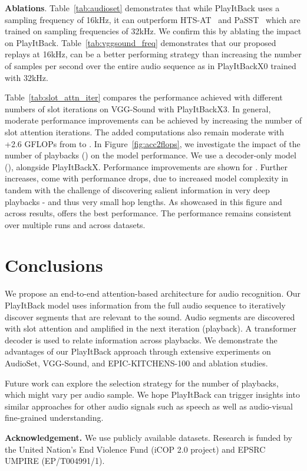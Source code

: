 \documentclass{article}
\begin{document}
\noindent
\textbf{Ablations}. 
Table~\ref{tab:audioset} demonstrates that while PlayItBack uses a sampling frequency of 16kHz, it can outperform HTS-AT~\cite{chen2022hts} and PaSST~\cite{koutini2021efficient} which are trained on sampling frequencies of 32kHz.
We confirm this by ablating the impact on PlayItBack.
Table~\ref{tab:vggsound_freq} demonstrates that our proposed replays at 16kHz, can be a better performing strategy than increasing the number of samples per second over the entire audio sequence as in PlayItBackX0 trained with 32kHz.

Table~\ref{tab:slot_attn_iter} compares the performance achieved with different numbers of slot iterations  on VGG-Sound with PlayItBackX3. In general, moderate performance improvements can be achieved by increasing the number of slot attention iterations. The added computations also remain moderate with +2.6 GFLOPs from  to . In Figure~\ref{fig:acc2flops}, we investigate the impact of the number of playbacks () on the model performance. We use a decoder-only model (), alongside PlayItBackX. 
Performance improvements are shown for . 
Further  increases, come with performance drops, due to increased model complexity in tandem with the challenge of discovering salient information in very deep playbacks - and thus very small hop lengths.
As showcased in this figure and across results,  offers the best performance.
The performance remains consistent over multiple runs and across datasets.


\section{Conclusions}
\vspace*{-6pt}
We propose an end-to-end attention-based architecture for audio recognition. Our PlayItBack model uses information from the full audio sequence to iteratively discover segments that are relevant to the sound. Audio segments are discovered with slot attention and amplified in the next iteration (playback). A transformer decoder is used to relate information across playbacks. 
We demonstrate the advantages of our PlayItBack approach through extensive experiments on AudioSet, VGG-Sound, and EPIC-KITCHENS-100 and ablation studies. 

Future work can explore the selection strategy for the number of playbacks, which might vary per audio sample. We hope PlayItBack can trigger insights into similar approaches for other audio signals such as speech as well as audio-visual fine-grained understanding.


\vspace*{6pt}
\noindent \textbf{Acknowledgement.} 
We use publicly available datasets.
Research is funded by the United Nation’s End Violence Fund (iCOP 2.0 project) and EPSRC UMPIRE (EP/T004991/1).

\vfill\pagebreak




\end{document}
